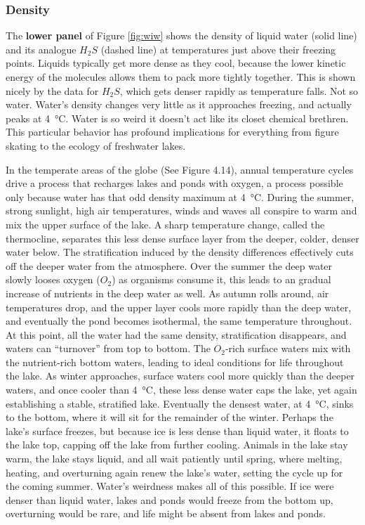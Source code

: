 \subsubsection{Density}
The \textbf{lower panel} of Figure \ref{fig:wiw} shows the density of liquid water (solid line) and its analogue $H_2S$ (dashed line) at temperatures just above their freezing points. Liquids typically get more dense as they cool, because the lower kinetic energy of the molecules allows them to pack more tightly together. This is shown nicely by the data for $H_2S$, which gets denser rapidly as temperature falls. Not so water. Water's density changes very little as it approaches freezing, and actually peaks at \SI{4}{\degreeCelsius}. Water is so weird it doesn't act like its closet chemical brethren. This particular behavior has profound implications for everything from figure skating to the ecology of freshwater lakes.

In the temperate areas of the globe (See Figure 4.14), annual temperature cycles drive a process that recharges lakes and ponds with oxygen, a process possible only because water has that odd density maximum at \SI{4}{\degreeCelsius}. During the summer, strong sunlight, high air temperatures, winds and waves all conspire to warm and mix the upper surface of the lake. A sharp temperature change, called the thermocline, separates this less dense surface layer from the deeper, colder, denser water below. The stratification induced by the density differences effectively cuts off the deeper water from the atmosphere. Over the summer the deep water slowly looses oxygen ($O_2$) as organisms consume it, this leads to an gradual increase of nutrients in the deep water as well. As autumn rolls around, air temperatures drop, and the upper layer cools more rapidly than the deep water, and eventually the pond becomes isothermal, the same temperature throughout. At this point, all the water had the same density, stratification disappears, and waters can ``turnover'' from top to bottom. The $O_2$-rich surface waters mix with the nutrient-rich bottom waters, leading to ideal conditions for life throughout the lake. As winter approaches, surface waters cool more quickly than the deeper waters, and once cooler than \SI{4}{\degreeCelsius}, these less dense water caps the lake, yet again establishing a stable, stratified lake. Eventually the densest water, at \SI{4}{\degreeCelsius}, sinks to the bottom, where it will sit for the remainder of the winter. Perhaps the lake's surface freezes, but because ice is less dense than liquid water, it floats to the lake top, capping off the lake from further cooling. Animals in the lake stay warm, the lake stays liquid, and all wait patiently until spring, where melting, heating, and overturning again renew the lake's water, setting the cycle up for the coming summer. Water's weirdness makes all of this possible. If ice were denser than liquid water, lakes and ponds would freeze from the bottom up, overturning would be rare, and life might be absent from lakes and ponds.      

